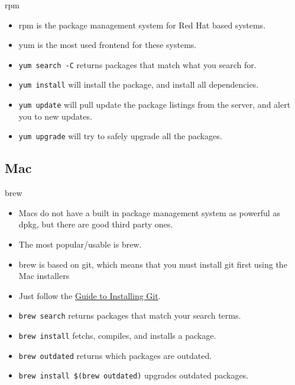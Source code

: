 \documentclass[10pt]{beamer}
\begin{document}
\begin{frame}{rpm}
\begin{itemize}[<+->]
\item rpm is the package management system for Red Hat based systems.
\item yum is the most used frontend for these systems.
\item \texttt{\color{blue}yum search -C} returns packages that match what you search for.
\item \texttt{\color{blue}yum install} will install the package, and install all dependencies.
\item \texttt{\color{blue}yum update} will pull update the package listings from the server, and alert you to new updates.
\item \texttt{\color{blue}yum upgrade} will try to safely upgrade all the packages.
\end{itemize}
\end{frame}

\subsection{Mac}
\begin{frame}{brew}
\begin{itemize}[<+->]
\item Macs do not have a built in package management system as powerful as dpkg, but there are good third party ones.
\item The most popular/usable is brew.
\item brew is based on git, which means that you must install git first using the Mac installers
\item Just follow the \href{http://help.github.com/mac-git-installation/}{\color{blue}Guide to Installing Git}.
\item \texttt{\color{blue}brew search} returns packages that match your search terms.
\item \texttt{\color{blue}brew install} fetchs, compiles, and installs a package.
\item \texttt{\color{blue}brew outdated} returns which packages are outdated.
\item \texttt{\color{blue}brew install \$(brew outdated)} upgrades outdated packages.
\end{itemize}
\end{frame}
\end{document}
